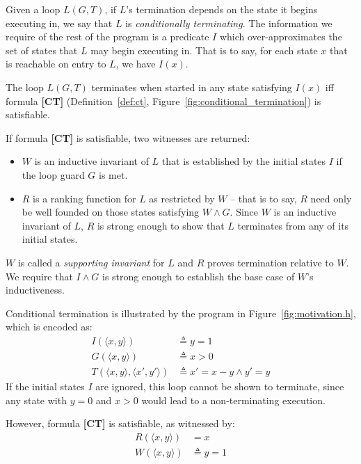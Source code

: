\documentclass[a4paper]{llncs}
\begin{document}
Given a loop $L(G,T)$, if $L$'s termination depends on the state it begins
executing in, we say that $L$ is \emph{conditionally terminating}.
The information we require of the rest of the program is a predicate $I$ which
over-approximates the set of states that $L$ may begin executing in.
That is to say, for each state $x$ that is reachable on entry to $L$,
we have $I(x)$.

\begin{theorem}
\label{thm:ct}
 The loop $L(G, T)$ terminates when started in any state satisfying $I(x)$ iff formula {\bf [CT]}
 (Definition~\ref{def:ct}, Figure~\ref{fig:conditional_termination}) is satisfiable.
\end{theorem}
% 

If formula {\bf [CT]} is satisfiable, two witnesses are returned:
\begin{itemize}
\item $W$ is an inductive invariant of $L$ that is established by the initial states $I$ if the loop
guard $G$ is met.
\item $R$ is a ranking function for $L$ as restricted by $W$ -- that is to say, $R$ need only
be well founded on those states satisfying $W \wedge G$.  Since $W$ is an inductive invariant of $L$,
$R$ is strong enough to show that $L$ terminates from any of its initial states.
\end{itemize}

$W$ is called a \emph{supporting invariant} for $L$ and $R$ proves termination relative to $W$.
We require that $I \wedge G$ is strong enough to establish the base case of $W$'s inductiveness.

Conditional termination is illustrated by the program in Figure~\ref{fig:motivation.h},
which is encoded as:
\begin{align*}
            I(\langle x, y \rangle) & \triangleq y = 1 \\
            G(\langle x, y \rangle) & \triangleq x > 0 \\
            T(\langle x, y \rangle, \langle x', y' \rangle) & \triangleq x' = x - y \wedge y' = y 
\end{align*}
If the initial states $I$ are ignored, this loop cannot be shown to terminate, since any state with $y = 0$ and $x > 0$
would lead to a non-terminating execution.

However, formula {\bf [CT]} is satisfiable, as witnessed by:
\begin{align*}
R(\langle x,y\rangle) & = x\\
W(\langle x, y \rangle ) & \triangleq y  = 1
\end{align*}
\end{document}
